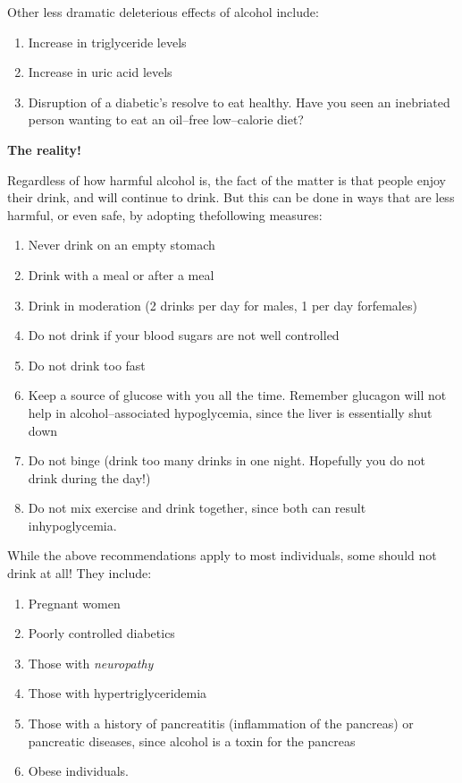\noindent Other less dramatic deleterious effects of alcohol include:
\begin{enumerate}[•]
\itemsep=0pt
\item Increase in triglyceride levels
\item Increase in uric acid levels
\item Disruption of a diabetic’s resolve to eat healthy. Have you seen an inebriated person wanting to eat an oil–free low–calorie diet?
\end{enumerate}

\noindent\textbf{The reality!}

Regardless of how harmful alcohol is, the fact of the matter is that people enjoy their drink, and will continue to drink. But this can be done in ways that are less harmful, or even safe, by adopting the\break following measures:
\begin{enumerate}[•]
\itemsep=0pt
\item Never drink on an empty stomach
\item Drink with a meal or after a meal
\item Drink in moderation (2 drinks per day for males, 1 per day for\break females)
\item Do not drink if your blood sugars are not well controlled
\item Do not drink too fast
\item Keep a source of glucose with you all the time. Remember glucagon will not help in alcohol–associated hypoglycemia, since the liver is essentially shut down
\item Do not binge (drink too many drinks in one night. Hopefully you do not drink during the day!)
\item Do not mix exercise and drink together, since both can result in\break hypoglycemia.
\end{enumerate}

While the above recommendations apply to most individuals, some should not drink at all! They include:

\begin{enumerate}[•]
\itemsep=0pt
\item Pregnant women
\item Poorly controlled diabetics
\item Those with \textit{neuropathy}
\item Those with hypertriglyceridemia
\item Those with a history of pancreatitis (inflammation of the pancreas) or pancreatic diseases, since alcohol is a toxin for the pancreas
\item Obese individuals.
\end{enumerate}

